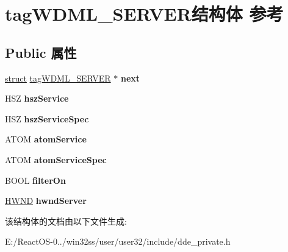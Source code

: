 \hypertarget{structtag_w_d_m_l___s_e_r_v_e_r}{}\section{tag\+W\+D\+M\+L\+\_\+\+S\+E\+R\+V\+E\+R结构体 参考}
\label{structtag_w_d_m_l___s_e_r_v_e_r}
\subsection*{Public 属性}
\begin{DoxyCompactItemize}
\item 
\mbox{\label{structtag_w_d_m_l___s_e_r_v_e_r_a5891eac69ab25861e51576543f20706d}} 
\hyperlink{interfacestruct}{struct} \hyperlink{structtag_w_d_m_l___s_e_r_v_e_r}{tag\+W\+D\+M\+L\+\_\+\+S\+E\+R\+V\+ER} $\ast$ {\bfseries next}
\item 
\mbox{\label{structtag_w_d_m_l___s_e_r_v_e_r_adc07436a5adf026654e1f584cce1111b}} 
H\+SZ {\bfseries hsz\+Service}
\item 
\mbox{\label{structtag_w_d_m_l___s_e_r_v_e_r_a624bf71a77b7069fdbf923473879c8a2}} 
H\+SZ {\bfseries hsz\+Service\+Spec}
\item 
\mbox{\label{structtag_w_d_m_l___s_e_r_v_e_r_a4288c993500751e6fc32b8b04dec0ca3}} 
A\+T\+OM {\bfseries atom\+Service}
\item 
\mbox{\label{structtag_w_d_m_l___s_e_r_v_e_r_ae965867c06dbe94a8714ec7c308bb781}} 
A\+T\+OM {\bfseries atom\+Service\+Spec}
\item 
\mbox{\label{structtag_w_d_m_l___s_e_r_v_e_r_a3be0f38672b5eacbc24a00ff081d759b}} 
B\+O\+OL {\bfseries filter\+On}
\item 
\mbox{\label{structtag_w_d_m_l___s_e_r_v_e_r_ad704e18adb94535186ccf833433ce84d}} 
\hyperlink{interfacevoid}{H\+W\+ND} {\bfseries hwnd\+Server}
\end{DoxyCompactItemize}


该结构体的文档由以下文件生成\+:\begin{DoxyCompactItemize}
\item 
E\+:/\+React\+O\+S-\/0../win32ss/user/user32/include/dde\+\_\+private.\+h\end{DoxyCompactItemize}
